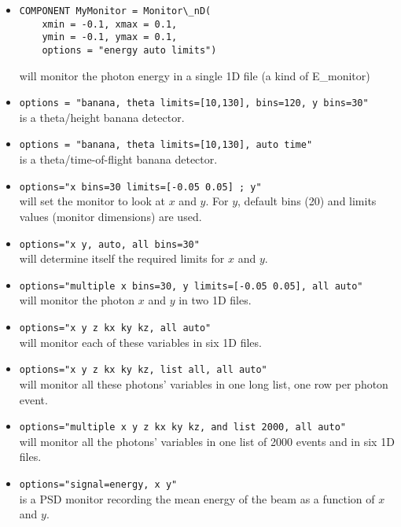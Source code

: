 \begin{itemize}
\item{
\begin{lstlisting}
COMPONENT MyMonitor = Monitor\_nD(
    xmin = -0.1, xmax = 0.1,
    ymin = -0.1, ymax = 0.1,
    options = "energy auto limits")
\end{lstlisting}
will monitor the photon energy in a single 1D file (a kind of E\_monitor)}
\item{\texttt{options = "banana, theta limits=[10,130], bins=120, y bins=30"} \\
    is a theta/height banana detector.}
\item{\texttt{options = "banana, theta limits=[10,130], auto time"} \\
    is a theta/time-of-flight banana detector.}

\item{\texttt{options="x bins=30 limits=[-0.05 0.05] ; y"} \\
    will set the monitor to look at $x$ and $y$. For $y$, default bins (20)
    and limits values (monitor dimensions) are used.}

\item{\texttt{options="x y, auto, all bins=30"} \\
    will determine itself the required limits for $x$ and $y$.}

\item{\texttt{options="multiple x bins=30, y limits=[-0.05 0.05], all auto"} \\
will monitor the photon $x$ and $y$ in two 1D files.}
\item{\texttt{options="x y z kx ky kz, all auto"} \\
will monitor each of these variables in six 1D files.}
\item{\texttt{options="x y z kx ky kz, list all, all auto"} \\
will monitor all these photons' variables in one long list, one row per photon event.}
\item{\texttt{options="multiple x y z kx ky kz, and list 2000, all auto"} \\
    will monitor all the photons' variables in one list of 2000 events
    and in six 1D files.}
\item{\texttt{options="signal=energy, x y"} \\
    is a PSD monitor recording the mean energy of the beam as a function of $x$ and $y$.}
\end{itemize}

